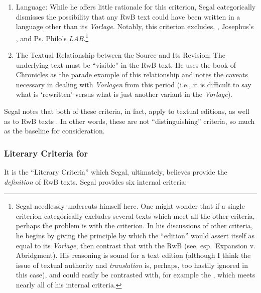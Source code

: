  \begin{enumerate}
    \item   Language: While he offers little rationale for this criterion, Segal categorically dismisses the possibility that any RwB text could have been written in a language other than its \emph{Vorlage}. Notably, this criterion excludes, \ga, Josephus's \ant, and Ps. Philo's \emph{LAB}.\footnote{Segal needlessly undercuts himself here. One might wonder that if a single criterion categorically excludes several texts which meet all the other criteria, perhaps the problem is with the criterion. In his discussions of other criteria, he begins by giving the principle by which the ``edition'' would assert itself as equal to its \emph{Vorlage}, then contrast that with the RwB (see, esp.~Expansion v. Abridgment). His reasoning is sound for a text edition (although I think the issue of textual authority and \emph{translation} is, perhaps, too hastily ignored in this case), and could easily be contrasted with, for example the \ga, which meets   nearly all of his internal criteria.}

    \item The Textual Relationship between the Source and Its Revision: The underlying text must be ``visible'' in the RwB text. He uses the book of Chronicles as the parade example of this relationship and notes the caveats necessary in dealing with \emph{Vorlagen} from this period (i.e., it is difficult to say what is `rewritten' versus what is just another variant in the \emph{Vorlage}).
\end{enumerate} 

Segal notes that both of these criteria, in fact, apply to textual editions, as well as to RwB texts \autocite[20]{segal_henze2005}. In other words, these are not ``distinguishing'' criteria, so much as the baseline for consideration. 

\subsubsection{Literary Criteria for \RWB}

It is the ``Literary Criteria'' which Segal, ultimately, believes provide the \emph{definition} of RwB texts.\autocite[20]{segal_henze2005} Segal provides six internal criteria: 

